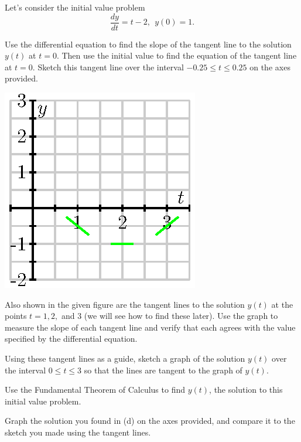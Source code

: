 \begin{pa} \label{PA:7.2}
Let's consider the initial value problem 
$$
\frac{dy}{dt} = t - 2, \ \ y(0) = 1.
$$

\ba
\item Use the differential equation to find the slope of the tangent
  line to the solution $y(t)$ at $t=0$.  Then use the initial value to
  find the equation of the tangent line at $t=0$.  Sketch this tangent
  line over the interval $-0.25\leq t\leq0.25$ on the axes provided.

  \begin{center}
    \includegraphics{figures/7_2_PA_tangents.eps}
  \end{center}

\item Also shown in the given figure are the tangent lines to the solution $y(t)$ at
  the points $t=1, 2,$ and $3$ (we will see how to find these later).
  Use the graph to measure the slope of each tangent line  
  and verify that each agrees with the value specified by the differential
  equation.  

\item Using these tangent lines as a guide, sketch a graph of the
  solution $y(t)$ over the interval $0\leq t\leq 3$ so that the lines
  are tangent to the graph of $y(t)$.

\item Use the Fundamental Theorem of Calculus to find $y(t)$, the
  solution to this initial value problem.

\item Graph the solution you found in (d) on the axes provided, and compare it to the sketch
  you made using the tangent lines.

\ea
\end{pa} 
\afterpa

